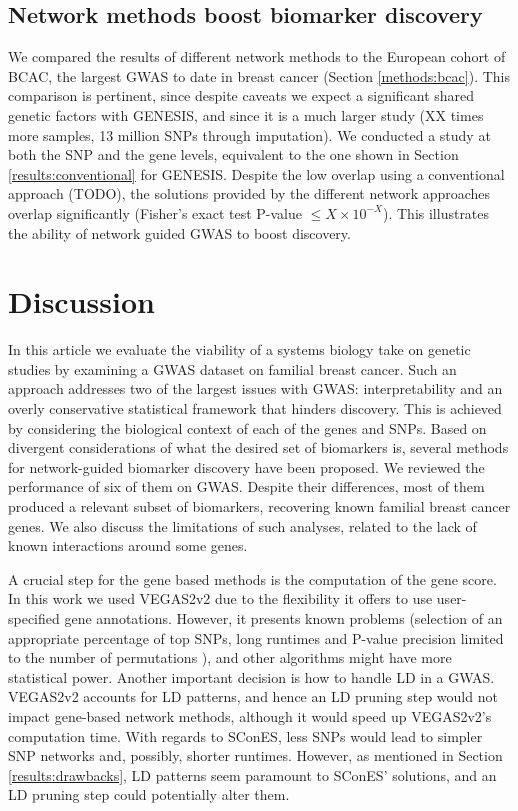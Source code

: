 \documentclass[twocolumn, 11pt, draft]{article}
\begin{document}
\subsection{Network methods boost biomarker discovery}

We compared the results of different network methods to the European cohort of BCAC, the largest GWAS to date in breast cancer (Section \ref{methods:bcac}). This comparison is pertinent, since despite caveats we expect a significant shared genetic factors with GENESIS, and since it is a much larger study (XX times more samples, 13 million SNPs through imputation). We conducted a study at both the SNP and the gene levels, equivalent to the one shown in Section \ref{results:conventional} for GENESIS. Despite the low overlap using a conventional approach (TODO), the solutions provided by the different network approaches overlap significantly (Fisher's exact test P-value $\leq X \times 10^{-X}$). This illustrates the ability of network guided GWAS to boost discovery.

\section{Discussion}

In this article we evaluate the viability of a systems biology take on genetic studies by examining a GWAS dataset on familial breast cancer. Such an approach addresses two of the largest issues with GWAS: interpretability and an overly conservative statistical framework that hinders discovery. This is achieved by considering the biological context of each of the genes and SNPs. Based on divergent considerations of what the desired set of biomarkers is, several methods for network-guided biomarker discovery have been proposed. We reviewed the performance of six of them on GWAS. Despite their differences, most of them produced a relevant subset of biomarkers, recovering known familial breast cancer genes. We also discuss the limitations of such analyses, related to the lack of known interactions around some genes. 

A crucial step for the gene based methods is the computation of the gene score. In this work we used VEGAS2v2 \cite{mishra_vegas2:_2015} due to the flexibility it offers to use user-specified gene annotations. However, it presents known problems (selection of an appropriate percentage of top SNPs, long runtimes and P-value precision limited to the number of permutations \cite{nakka_gene_2016}), and other algorithms might have more statistical power. Another important decision is how to handle LD in a GWAS. VEGAS2v2 accounts for LD patterns, and hence an LD pruning step would not impact gene-based network methods, although it would speed up VEGAS2v2's computation time. With regards to SConES, less SNPs would lead to simpler SNP networks and, possibly, shorter runtimes. However, as mentioned in Section \ref{results:drawbacks}, LD patterns seem paramount to SConES' solutions, and an LD pruning step could potentially alter them. 
\end{document}

